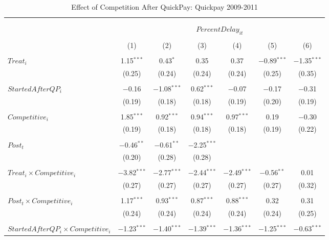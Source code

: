 \documentclass[
]{article}
\begin{document}
\begin{table}[H] \centering 
  \caption{Effect of Competition After QuickPay: Quickpay 2009-2011} 
  \label{} 
\small 
\begin{tabular}{@{\extracolsep{-3pt}}lcccccc} 
\\[-1.8ex]\hline 
\hline \\[-1.8ex] 
\\[-1.8ex] & \multicolumn{6}{c}{$PercentDelay_{it}$  } \\ 
\\[-1.8ex] & (1) & (2) & (3) & (4) & (5) & (6)\\ 
\hline \\[-1.8ex] 
 $Treat_i$ & 1.15$^{***}$ & 0.43$^{*}$ & 0.35 & 0.37 & $-$0.89$^{***}$ & $-$1.35$^{***}$ \\ 
  & (0.25) & (0.24) & (0.24) & (0.24) & (0.25) & (0.35) \\ 
  & & & & & & \\ 
 $StartedAfterQP_i$ & $-$0.16 & $-$1.08$^{***}$ & 0.62$^{***}$ & $-$0.07 & $-$0.17 & $-$0.31 \\ 
  & (0.19) & (0.18) & (0.18) & (0.19) & (0.20) & (0.19) \\ 
  & & & & & & \\ 
 $Competitive_i$ & 1.85$^{***}$ & 0.92$^{***}$ & 0.94$^{***}$ & 0.97$^{***}$ & 0.19 & $-$0.30 \\ 
  & (0.19) & (0.18) & (0.18) & (0.18) & (0.19) & (0.22) \\ 
  & & & & & & \\ 
 $Post_t$ & $-$0.46$^{**}$ & $-$0.61$^{**}$ & $-$2.25$^{***}$ &  &  &  \\ 
  & (0.20) & (0.28) & (0.28) &  &  &  \\ 
  & & & & & & \\ 
 $Treat_i \times Competitive_i$ & $-$3.82$^{***}$ & $-$2.77$^{***}$ & $-$2.44$^{***}$ & $-$2.49$^{***}$ & $-$0.56$^{**}$ & 0.01 \\ 
  & (0.27) & (0.27) & (0.27) & (0.27) & (0.27) & (0.32) \\ 
  & & & & & & \\ 
 $Post_t \times Competitive_i$ & 1.17$^{***}$ & 0.93$^{***}$ & 0.87$^{***}$ & 0.88$^{***}$ & 0.32 & 0.31 \\ 
  & (0.24) & (0.24) & (0.24) & (0.24) & (0.24) & (0.25) \\ 
  & & & & & & \\ 
 $StartedAfterQP_i \times Competitive_i$ & $-$1.23$^{***}$ & $-$1.40$^{***}$ & $-$1.39$^{***}$ & $-$1.36$^{***}$ & $-$1.25$^{***}$ & $-$0.63$^{***}$ \\ 

\end{tabular}
\end{table}
\end{document}
